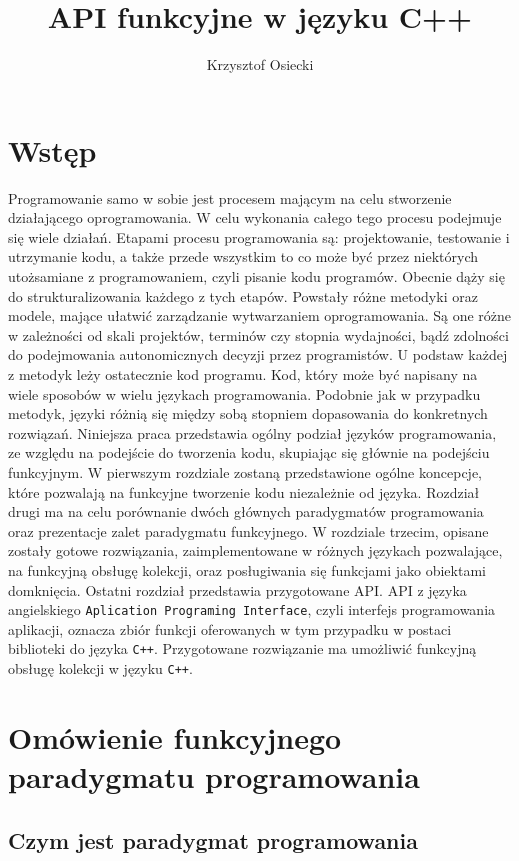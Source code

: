 \documentclass[a4paper,10pt]{report}
\title{API funkcyjne w języku C++}
\author{Krzysztof Osiecki}
\begin{document}
\pagestyle{fancy}\lhead{}\rightmark

\tableofcontents{}
\chapter*{Wstęp}
Programowanie samo w sobie jest procesem mającym na celu stworzenie działającego oprogramowania. W celu wykonania całego tego procesu podejmuje się wiele działań. Etapami procesu programowania są: projektowanie, testowanie i utrzymanie kodu, a także przede wszystkim to co może być przez niektórych utożsamiane z programowaniem, czyli pisanie kodu programów. Obecnie dąży się do strukturalizowania każdego z tych etapów. Powstały różne metodyki oraz modele, mające ułatwić zarządzanie wytwarzaniem oprogramowania. Są one różne w zależności od skali projektów, terminów czy stopnia wydajności, bądź zdolności do podejmowania autonomicznych decyzji przez programistów. U podstaw każdej z metodyk leży ostatecznie kod programu. Kod, który może być napisany na wiele sposobów w wielu językach programowania. Podobnie jak w przypadku metodyk, języki różnią się między sobą stopniem dopasowania do konkretnych rozwiązań. Niniejsza praca przedstawia ogólny podział języków programowania, ze względu na podejście do tworzenia kodu, skupiając się głównie na podejściu funkcyjnym. W pierwszym rozdziale zostaną przedstawione ogólne koncepcje, które pozwalają na funkcyjne tworzenie kodu niezależnie od języka. Rozdział drugi ma na celu porównanie dwóch głównych paradygmatów programowania oraz prezentacje zalet paradygmatu funkcyjnego. W rozdziale trzecim, opisane zostały gotowe rozwiązania, zaimplementowane w różnych językach pozwalające, na funkcyjną obsługę kolekcji, oraz posługiwania się funkcjami jako obiektami domknięcia. Ostatni rozdział przedstawia przygotowane API. API z języka angielskiego \verb|Aplication Programing Interface|, czyli interfejs programowania aplikacji, oznacza zbiór funkcji oferowanych w tym przypadku w postaci biblioteki do języka \verb|C++|. Przygotowane rozwiązanie ma umożliwić funkcyjną obsługę kolekcji w języku \verb|C++|. 
\chapter{Omówienie funkcyjnego paradygmatu programowania}
\section{Czym jest paradygmat programowania}
\end{document}

